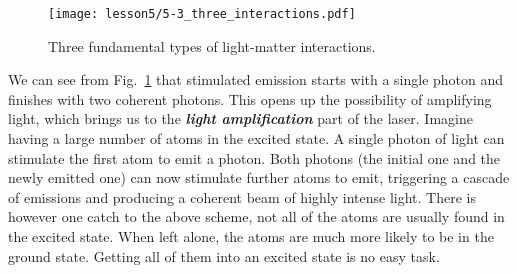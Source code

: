 \begin{figure}[t]
    \centering
    \texttt{[image: lesson5/5-3\_three\_interactions.pdf]}
    \caption[Light-matter interactions.]{Three fundamental types of light-matter interactions.}
    \label{fig:5-3_light_matter_interaction}
\end{figure}

We can see from Fig.~\ref{fig:5-3_light_matter_interaction} that stimulated emission starts with a single photon and finishes with two coherent photons.
This opens up the possibility of amplifying light, which brings us to the \textbf{\emph{light amplification}} part of the laser.
Imagine having a large number of atoms in the excited state.
A single photon of light can stimulate the first atom to emit a photon.
Both photons (the initial one and the newly emitted one) can now stimulate further atoms to emit, triggering a cascade of emissions and producing a coherent beam of highly intense light. 
There is however one catch to the above scheme, not all of the atoms are usually found in the excited state.
When left alone, the atoms are much more likely to be in the ground state.
Getting all of them into an excited state is no easy task.

